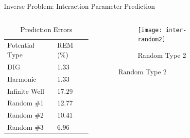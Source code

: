 \documentclass{beamer}
\begin{document}
\begin{frame}{Inverse Problem: Interaction Parameter Prediction}
    \begin{columns}
        \begin{column}{0.4\textwidth}
            \begin{table}[]
                \centering
                \caption{Prediction Errors}
                \begin{tabular}{ll}
                    Potential Type & REM (\%) \\
                    DIG            & 1.33     \\
                    Harmonic       & 1.33     \\
                    Infinite Well  & 17.29    \\
                    Random \#1     & 12.77    \\
                    Random \#2     & 10.41    \\
                    Random \#3     & 6.96                    
                \end{tabular}
            \end{table}
        \end{column}
        \begin{column}{0.8\textwidth}
        \graphicspath{{"../figs/training/interaction/"}}
        \begin{figure}[H]
            \begin{subfigure}[t]{0.80\textwidth}
                \texttt{[image: inter-random2]}
            \caption{Random Type 2}
            \end{subfigure}
        \end{figure}
        \end{column}
    \end{columns}
\end{frame}
\end{document}

